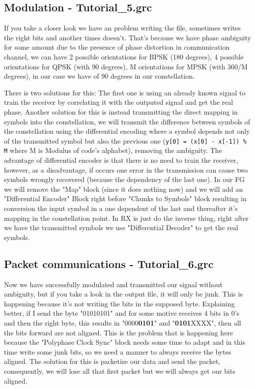 \documentclass[a4paper, 10pt, conference]{ieeeconf}      %
\begin{document}
\subsection{Modulation - Tutorial\_5.grc}
    If you take a closer look we have an problem writing the file, sometimes writes the right bits and another times doesn't.  That's because we have phase ambiguity for some amount due to the presence of phase distortion in communication channel, we can have 2 possible orientations for BPSK (180 degrees), 4 possible orientations for QPSK (with 90 degrees), M orientations for MPSK (with 360/M degrees), in our case we have of 90 degrees in our constellation. 
    
    There is two solutions for this: The first one is using an already known signal to train the receiver by correlating it with the outputed signal and get the real phase.  Another solution for this is instead transmitting the direct mapping in symbols into the constellation, we will transmit the difference between symbols of the constellation using the differential encoding where a symbol depends not only of the transmitted symbol but also the previous one (\verb|y[0] = (x[0] - x[-1]) % M| where M is Modulus of code's alphabet), removing the ambiguity. The advantage of differential encoder is that there is no need to train the receiver, however, as a disadvantage, if occurs one error in the transmission can cause two symbols wrongly recovered (because the dependency of the last one).
    In our FG we will remove the "Map" block (since it does nothing now) and we will add an "Differential Encoder" Block right before "Chunks to Symbols" block resulting in conversion the input symbol in a one dependent of the last and thereafter it's mapping in the constellation point. 
    In RX is just do the inverse thing, right after we have the transmitted symbols we use "Differential Decoder" to get the real symbols.
    
    
\subsection{Packet communications - Tutorial\_6.grc}
    Now we have successfully modulated and transmitted our signal without ambiguity, but if you take a look in the output file, it will only be junk. This is happening because it's not writing the bits in the supposed byte. Explaining better, if I send the byte "01010101" and for some motive receives 4 bits in 0's and then the right byte, this results in "0000\textbf{0101}" and "\textbf{0101}XXXX", then all the bits forward are not aligned. This is the problem that is happening here because the "Polyphase Clock Sync" block needs some time to adapt and in this time write some junk bits, so we need a manner to always receive the bytes aligned. The solution for this is packetize our data and send the packet, consequently, we will lose all that first packet but we will always get our bits aligned.
    
\end{document}
